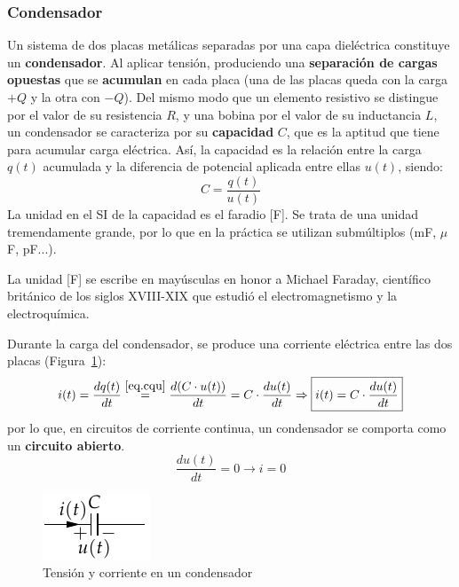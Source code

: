 	
	\subsubsection{Condensador}\label{sec.condensador}
	
	Un sistema de dos placas metálicas separadas por una capa dieléctrica constituye un \textbf{condensador}. Al aplicar tensión, produciendo una \textbf{separación de cargas opuestas} que se \textbf{acumulan} en cada placa (una de las placas queda con la carga $+Q$ y la otra con $-Q$). Del mismo modo que un elemento resistivo se distingue por el valor de su resistencia $R$, y una bobina por el valor de su inductancia $L$, un condensador se caracteriza por su \textbf{capacidad} $C$, que es la aptitud que tiene para acumular carga eléctrica. Así, la capacidad es la relación entre la carga $q(t)$ acumulada y la diferencia de potencial aplicada entre ellas $u(t)$, siendo:
	\begin{equation}\label{eq.cqu}
		\boxed{C=\dfrac{q(t)}{u(t)}}
	\end{equation}
	La unidad en el SI de la capacidad es el faradio [F]. Se trata de una unidad tremendamente grande, por lo que en la práctica se utilizan submúltiplos (mF, $\mu$F, pF...). 
	\begin{remark}
		La unidad [F] se escribe en mayúsculas en honor a Michael Faraday, científico británico de los siglos XVIII-XIX que estudió el electromagnetismo y la electroquímica. 
	\end{remark}
	
	Durante la carga del condensador, se produce una corriente eléctrica entre las dos placas (Figura~\ref{fig.condensador}): 
	\begin{equation}\label{eq.icu}
		i(t)=\dfrac{dq(t)}{dt}\stackrel{\eqref{eq.cqu}}{=}\dfrac{d(C\cdot u(t))}{dt}=C\cdot \dfrac{du(t)}{dt} \Rightarrow \boxed{i(t)=C\cdot \dfrac{du(t)}{dt}}
	\end{equation}
	por lo que, en circuitos de corriente continua, un condensador se comporta como un \textbf{circuito abierto}.
	\begin{equation*}
		\frac{du(t)}{dt} = 0 \rightarrow i = 0
	\end{equation*}
	\begin{figure}[H]
		\centering
		\includegraphics[width=0.15\linewidth]{../figs/Condensador.pdf}
		\caption{Tensión y corriente en un condensador}
		\label{fig.condensador}
	\end{figure}
	
